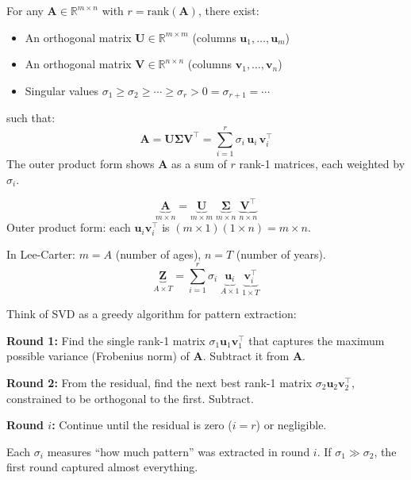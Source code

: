 \documentclass[11pt,a4paper]{article}
\begin{document}
\begin{formaldef}
For any $\bm{A} \in \mathbb{R}^{m \times n}$ with $r = \mathrm{rank}(\bm{A})$, there exist:
\begin{itemize}[nosep]
  \item An orthogonal matrix $\bm{U} \in \mathbb{R}^{m \times m}$ (columns $\bm{u}_1, \ldots, \bm{u}_m$)
  \item An orthogonal matrix $\bm{V} \in \mathbb{R}^{n \times n}$ (columns $\bm{v}_1, \ldots, \bm{v}_n$)
  \item Singular values $\sigma_1 \geq \sigma_2 \geq \cdots \geq \sigma_r > 0 = \sigma_{r+1} = \cdots$
\end{itemize}
such that:
\[
\bm{A} = \bm{U}\bm{\Sigma}\bm{V}^\top = \sum_{i=1}^{r} \sigma_i \, \bm{u}_i \, \bm{v}_i^\top
\]
The outer product form shows $\bm{A}$ as a sum of $r$ rank-1 matrices, each weighted by $\sigma_i$.
\end{formaldef}

\begin{dimcheck}
\[
\underbrace{\bm{A}}_{m \times n} = \underbrace{\bm{U}}_{m \times m} \; \underbrace{\bm{\Sigma}}_{m \times n} \; \underbrace{\bm{V}^\top}_{n \times n}
\]
Outer product form: each $\bm{u}_i \bm{v}_i^\top$ is $(m \times 1)(1 \times n) = m \times n$.

In Lee-Carter: $m = A$ (number of ages), $n = T$ (number of years).
\[
\underbrace{\bm{Z}}_{A \times T} = \sum_{i=1}^{r} \sigma_i \; \underbrace{\bm{u}_i}_{A \times 1} \; \underbrace{\bm{v}_i^\top}_{1 \times T}
\]
\end{dimcheck}

\begin{intuition}
Think of SVD as a greedy algorithm for pattern extraction:

\textbf{Round 1:} Find the single rank-1 matrix $\sigma_1 \bm{u}_1 \bm{v}_1^\top$ that captures
the maximum possible variance (Frobenius norm) of $\bm{A}$. Subtract it from $\bm{A}$.

\textbf{Round 2:} From the residual, find the next best rank-1 matrix $\sigma_2 \bm{u}_2 \bm{v}_2^\top$,
constrained to be orthogonal to the first. Subtract.

\textbf{Round $i$:} Continue until the residual is zero ($i = r$) or negligible.

Each $\sigma_i$ measures ``how much pattern'' was extracted in round $i$.
If $\sigma_1 \gg \sigma_2$, the first round captured almost everything.
\end{intuition}
\end{document}

